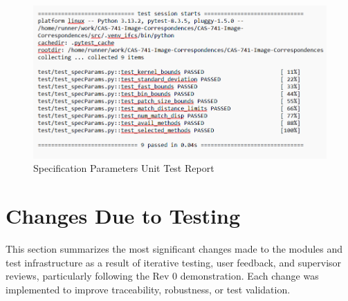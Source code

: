\documentclass[12pt, titlepage]{article}
\begin{document}
\begin{figure}[h!]
  \centering
  \includegraphics[width=0.9\linewidth]{images/specParams_report.png}
  \caption{Specification Parameters Unit Test Report}
  \label{sp_report}
\end{figure}

\newpage
\section{Changes Due to Testing}

This section summarizes the most significant changes made to the modules and test infrastructure as a result of iterative testing, user feedback, and supervisor reviews, particularly following the Rev 0 demonstration. Each change was implemented to improve traceability, robustness, or test validation.
\end{document}
